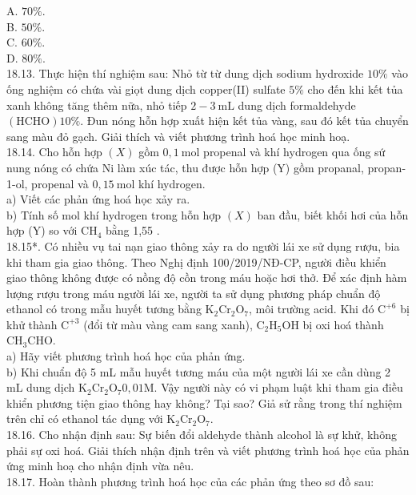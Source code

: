 \documentclass[10pt]{article}
\begin{document}
A. $70 \%$.\\
B. $50 \%$.\\
C. $60 \%$.\\
D. $80 \%$.\\
18.13. Thực hiện thí nghiệm sau: Nhỏ từ từ dung dịch sodium hydroxide $10 \%$ vào ống nghiệm có chứa vài giọt dung dịch copper(II) sulfate $5 \%$ cho đến khi kết tủa xanh không tăng thêm nữa, nhỏ tiếp $2-3 \mathrm{~mL}$ dung dịch formaldehyde $(\mathrm{HCHO}) 10 \%$. Đun nóng hỗn hợp xuất hiện kết tủa vàng, sau đó kết tủa chuyển sang màu đỏ gạch. Giải thích và viết phương trình hoá học minh hoạ.\\
18.14. Cho hỗn hợp $(X)$ gồm $0,1 \mathrm{~mol}$ propenal và khí hydrogen qua ống sứ nung nóng có chứa Ni làm xúc tác, thu được hỗn hợp (Y) gồm propanal, propan-1-ol, propenal và $0,15 \mathrm{~mol}$ khí hydrogen.\\
a) Viết các phản ứng hoá học xảy ra.\\
b) Tính số mol khí hydrogen trong hỗn hợp $(X)$ ban đầu, biết khối hơi của hỗn hợp (Y) so với $\mathrm{CH}_{4}$ bằng 1,55 .\\
18.15*. Có nhiều vụ tai nạn giao thông xảy ra do người lái xe sử dụng rượu, bia khi tham gia giao thông. Theo Nghị định 100/2019/NĐ-CP, người điều khiển giao thông không được có nồng độ cồn trong máu hoặc hơi thở. Để xác định hàm lượng rượu trong máu người lái xe, người ta sử dụng phương pháp chuẩn độ ethanol có trong mẫu huyết tương bằng $\mathrm{K}_{2} \mathrm{Cr}_{2} \mathrm{O}_{7}$, môi trường acid. Khi đó $\mathrm{C}^{+6}$ bị khử thành $\mathrm{C}^{+3}$ (đổi từ màu vàng cam sang xanh), $\mathrm{C}_{2} \mathrm{H}_{5} \mathrm{OH}$ bị oxi hoá thành $\mathrm{CH}_{3} \mathrm{CHO}$.\\
a) Hãy viết phương trình hoá học của phản ứng.\\
b) Khi chuẩn độ 5 mL mẫu huyết tương máu của một người lái xe cần dùng 2 mL dung dịch $\mathrm{K}_{2} \mathrm{Cr}_{2} \mathrm{O}_{7} 0,01 \mathrm{M}$. Vậy người này có vi phạm luật khi tham gia điều khiển phương tiện giao thông hay không? Tại sao? Giả sử rằng trong thí nghiệm trên chỉ có ethanol tác dụng với $\mathrm{K}_{2} \mathrm{Cr}_{2} \mathrm{O}_{7}$.\\
18.16. Cho nhận định sau: Sự biến đổi aldehyde thành alcohol là sự khử, không phải sự oxi hoá. Giải thích nhận định trên và viết phương trình hoá học của phản ứng minh hoạ cho nhận định vừa nêu.\\
18.17. Hoàn thành phương trình hoá học của các phản ứng theo sơ đồ sau:\\
\end{document}
